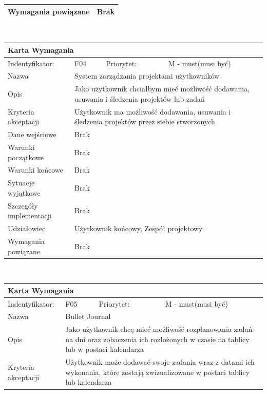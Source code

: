 \documentclass[a4paper,11pt]{report}
\begin{document}
\begin{itemize}
\begin{tabular}{|p{3cm}|p{2cm}|p{2cm}|p{6cm}|}
		Wymagania powiązane & \multicolumn{3}{|p{10 cm}|}{Brak}\\
		\hline
		\end{tabular}\\
		\begin{tabular}{|p{3cm}|p{2cm}|p{2cm}|p{6cm}|}
		\hline
		\multicolumn{4}{|p{12 cm}|}{Karta Wymagania}\\
		\hline
		Indentyfikator: & F04 & Priorytet: & M - must(musi być)\\
		\hline
		Nazwa & \multicolumn{3}{|p{10 cm}|}{System zarządzania projektami użytkowników}\\
		\hline
		Opis & \multicolumn{3}{|p{10 cm}|}{Jako użytkownik chciałbym mieć możliwość dodawania, usuwania i śledzenia projektów lub zadań}\\
		\hline
		Kryteria akceptacji & \multicolumn{3}{|p{10 cm}|}{Użytkownik ma możliwość dodawania, usuwania i śledzenia projektów przez siebie stworzonych}\\
		\hline
		Dane wejściowe & \multicolumn{3}{|p{10 cm}|}{Brak}\\
		\hline
		Warunki początkowe & \multicolumn{3}{|p{10 cm}|}{Brak}\\
		\hline
		Warunki końcowe & \multicolumn{3}{|p{10 cm}|}{Brak}\\
		\hline
		Sytuacje wyjątkowe & \multicolumn{3}{|p{10 cm}|}{Brak}\\
		\hline
		Szczegóły implementacji & \multicolumn{3}{|p{10 cm}|}{Brak}\\
		\hline
		Udziałowiec & \multicolumn{3}{|p{10 cm}|}{Użytkownik końcowy, Zespół projektowy}\\
		\hline
		Wymagania powiązane & \multicolumn{3}{|p{10 cm}|}{Brak}\\
		\hline
		\end{tabular}\\
		\begin{tabular}{|p{3cm}|p{2cm}|p{2cm}|p{6cm}|}
		\hline
		\multicolumn{4}{|p{12 cm}|}{Karta Wymagania}\\
		\hline
		Indentyfikator: & F05 & Priorytet: & M - must(musi być)\\
		\hline
		Nazwa & \multicolumn{3}{|p{10 cm}|}{Bullet Journal}\\
		\hline
		Opis & \multicolumn{3}{|p{10 cm}|}{Jako użytkownik chcę mieć możliwość rozplanowania zadań na dni oraz zobaczenia ich rozłożonych w czasie na tablicy lub w postaci kalendarza}\\
		\hline
		Kryteria akceptacji & \multicolumn{3}{|p{10 cm}|}{Użytkownik może dodawać swoje zadania wraz z datami ich wykonania, które zostają zwizualizowane w postaci tablicy lub kalendarza}\\

\end{tabular}
\end{itemize}
\end{document}
